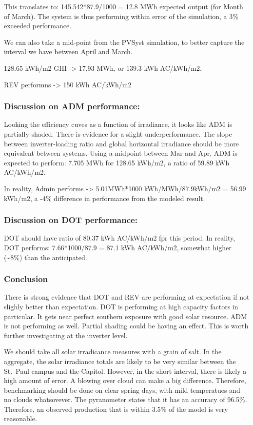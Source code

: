 \documentclass[]{article}
\begin{document}
This translates to: 145.542*87.9/1000 = 12.8 MWh expected output (for
Month of March). The system is thus performing within error of the
simulation, a 3\% exceeded performance.

We can also take a mid-point from the PVSyst simulation, to better
capture the interval we have between April and March.

128.65 kWh/m2 GHI -\textgreater{} 17.93 MWh, or 139.3 kWh AC/kWh/m2.

REV performns -\textgreater{} 150 kWh AC/kWh/m2

\subsubsection{Discussion on ADM
performance:}\label{discussion-on-adm-performance}

Looking the efficiency cuves as a function of irradiance, it looks like
ADM is partially shaded. There is evidence for a slight
underperformance. The slope between inverter-loading ratio and global
horizontal irradiance should be more equivalent between systems. Using a
midpoint between Mar and Apr, ADM is expected to perform: 7.705 MWh for
128.65 kWh/m2, a ratio of 59.89 kWh AC/kWh/m2.

In reality, Admin performs -\textgreater{} 5.01MWh*1000
kWh/MWh/87.9kWh/m2 = 56.99 kWh/m2, a -4\% difference in performance from
the modeled result.

\subsubsection{Discussion on DOT
performance:}\label{discussion-on-dot-performance}

DOT should have ratio of 80.37 kWh AC/kWh/m2 fpr this period. In
reality, DOT performs: 7.66*1000/87.9 = 87.1 kWh AC/kWh/m2, somewhat
higher (\textasciitilde{}8\%) than the anticipated.

\subsubsection{Conclusion}\label{conclusion}

There is strong evidence that DOT and REV are performing at expectation
if not slighly better than expectation. DOT is performing at high
capacity factors in particular. It gets near perfect southern exposure
with good solar resource. ADM is not performing as well. Partial shading
could be having an effect. This is worth further investigating at the
inverter level.

We should take all solar irradicance measures with a grain of salt. In
the aggregate, the solar irradiance totals are likely to be very similar
between the St.~Paul campus and the Capitol. However, in the short
interval, there is likely a high amount of error. A blowing over cloud
can make a big difference. Therefore, benchmarking should be done on
clear spring days, with mild temperatues and no clouds whatsovever. The
pyranometer states that it has an accuracy of 96.5\%. Therefore, an
observed production that is within 3.5\% of the model is very
reasonable.
\end{document}
